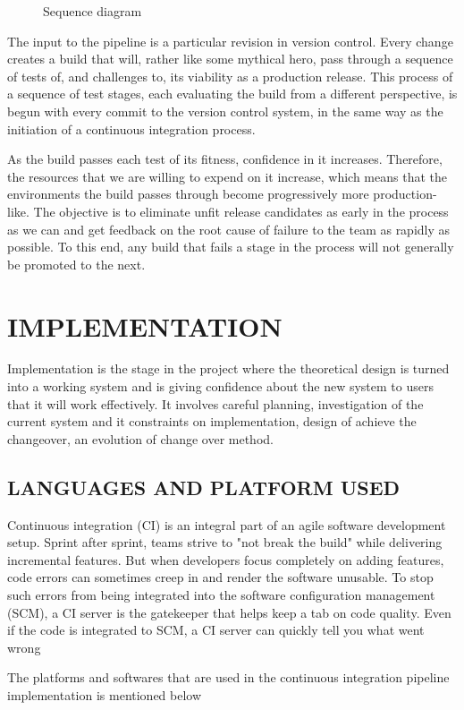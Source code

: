 \documentclass[12pt,a4paper,oneside]{report}
\begin{document}
{\begin{figure}[h]
\begin{center}
\hspace{.0 in}
\caption{Sequence diagram}
\end{center}

\end{figure}
\par
The input to the pipeline is a particular revision in version control. Every change creates a build that will, rather like some mythical hero, pass through a sequence of tests of, and challenges to, its viability as a production release. This process of a sequence of test stages, each evaluating the build from a different perspective, is begun with every commit to the version control system, in the same way as the initiation of a continuous integration process.
\par
As the build passes each test of its fitness, confidence in it increases. Therefore, the resources that we are willing to expend on it increase, which means that the environments the build passes through become progressively more production-like. The objective is to eliminate unfit release candidates as early in the process as we can and get feedback on the root cause of failure to the team as rapidly as possible. To this end, any build that fails a stage in the process will not generally be promoted to the next.
\chapter{IMPLEMENTATION}
Implementation is the stage in the project where the theoretical design is turned into a working system and is giving confidence about the new system to users that it will work effectively. It involves careful planning, investigation of the current system and it constraints on implementation, design of achieve the changeover, an evolution of change over method.

\section{LANGUAGES AND PLATFORM USED}
\par Continuous integration (CI) is an integral part of an agile software development setup. Sprint after sprint, teams strive to "not break the build" while delivering incremental features. But when developers focus completely on adding features, code errors can sometimes creep in and render the software unusable. To stop such errors from being integrated into the software configuration management (SCM), a CI server is the gatekeeper that helps keep a tab on code quality. Even if the code is integrated to SCM, a CI server can quickly tell you what went wrong
\par
	The platforms and softwares that are used in the continuous integration pipeline implementation is mentioned below 
}
\end{document}

